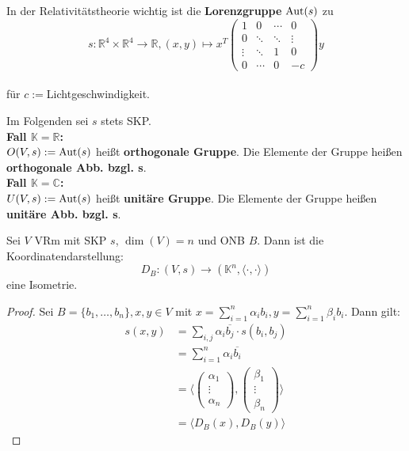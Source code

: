 \documentclass[parskip,a4paper,twoside,DIV15,BCOR12mm]{scrbook}
\begin{document}
\begin{example}
In der Relativitätstheorie wichtig ist die \textbf{Lorenzgruppe} $\operatorname{Aut}(s)$ zu\\
\[s:\mathbb{R}^4 \times \mathbb{R}^4 \to\mathbb{R}, (x,y)\mapsto x^T
\begin{pmatrix}
1&0&\cdots&0\\
0&\ddots&\ddots&\vdots\\
\vdots&\ddots&1&0\\
0&\cdots&0&-c
\end{pmatrix}
y\]\\ 
für $c:=$Lichtgeschwindigkeit.
\end{example}

\begin{definition}
Im Folgenden sei $s$ stets SKP.\\
\textbf{Fall $\mathbb{K}=\mathbb{R}$:}\\
$O(V,s):=\operatorname{Aut}(s)$ heißt \textbf{orthogonale Gruppe}. Die Elemente der Gruppe
heißen \textbf{orthogonale Abb. bzgl. s}.\\
\textbf{Fall $\mathbb{K}=\mathbb{C}$:}\\
$U(V,s):=\operatorname{Aut}(s)$ heißt \textbf{unitäre Gruppe}. Die Elemente der Gruppe heißen
\textbf{unitäre Abb. bzgl. s}.
\end{definition}

\begin{comment}
Eine wichtige Isometrie ist: abstrakter VRm $\cong$ Standardraum
\end{comment}

\begin{theo}
\label{Satz 19.1}
Sei $V$ VRm mit SKP $s$, $\dim(V)=n$ und ONB $B$. Dann ist die Koordinatendarstellung:\\
\[D_B:(V,s)\to(\mathbb{K}^n,\langle\cdot,\cdot\rangle)\] eine Isometrie.
\end{theo}

\begin{proof}
Sei $B=\{b_1,\ldots,b_n\}, x,y\in V$ mit $x=\sum_{i=1}^n{\alpha_i b_i},
y=\sum_{i=1}^n{\beta_i b_i}$. Dann gilt:
\begin{align*}
s(x,y)&=\sum_{i,j}{\alpha_i \overline{b_j}\cdot s(b_i,b_j)}\\
&= \sum_{i=1}^n{\alpha_i \overline{b_i}}\\
&= \langle
\begin{pmatrix}
\alpha_1\\
\vdots\\
\alpha_n
\end{pmatrix},
\begin{pmatrix}
\beta_1\\
\vdots\\
\beta_n
\end{pmatrix} 
\rangle\\
&= \langle D_B(x),D_B(y)\rangle
\end{align*}
\end{proof}
\end{document}
